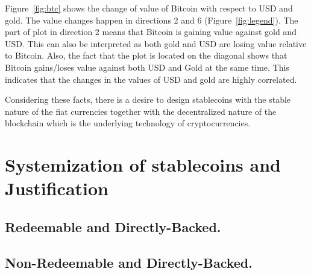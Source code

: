 Figure~\ref{fig:btc} shows the change of value of Bitcoin with respect to USD and gold. The value changes happen in directions 2 and 6 (Figure~\ref{fig:legend}). The part of plot in direction 2 means that Bitcoin is gaining value against gold and USD. This can also be interpreted as both gold and USD are losing value relative to Bitcoin. %
Also, the fact that the plot is located on the diagonal shows that Bitcoin gains/loses value against both USD and Gold at the same time. This indicates that the changes in the values of USD and gold are highly correlated.

Considering these facts, there is a desire to design stablecoins with the stable nature of the fiat currencies together with the decentralized nature of the blockchain which is the underlying technology of cryptocurrencies.


\section{Systemization of stablecoins and Justification}
 \par

 


\subsection{Redeemable and Directly-Backed.} 

\subsection{Non-Redeemable and Directly-Backed.} 


